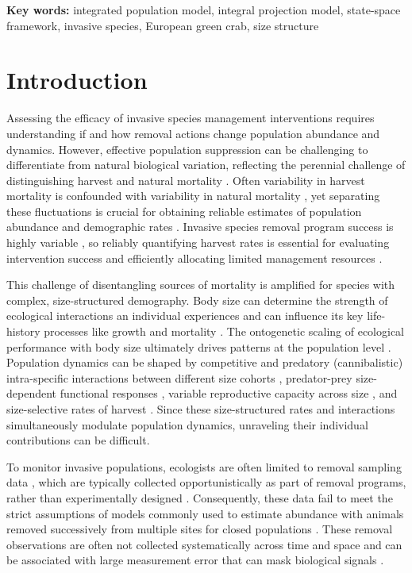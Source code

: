 \documentclass{article}
\begin{document}
\textbf{Key words:} integrated population model, integral projection model, state-space framework, invasive species, European green crab, size structure

\newpage

\section{Introduction}

Assessing the efficacy of invasive species management interventions requires understanding if and how removal actions change population abundance and dynamics. However, effective population suppression can be challenging to differentiate from natural biological variation, reflecting the perennial challenge of distinguishing harvest and natural mortality \parencite{aanes2007estimation}. Often variability in harvest mortality is confounded with variability in natural mortality \parencite{lewy2003modelling}, yet separating these fluctuations is crucial for obtaining reliable estimates of population abundance and demographic rates \parencite{walters2004fisheries}. Invasive species removal program success is highly variable \parencite{prior2018does}, so reliably quantifying harvest rates is essential for evaluating intervention success and efficiently allocating limited management resources \parencite{green2021functional}.

This challenge of disentangling sources of mortality is amplified for species with complex, size-structured demography. Body size can determine the strength of ecological interactions an individual experiences and can influence its key life-history processes like growth and mortality \parencite{de2003influence}. The ontogenetic scaling of ecological performance with body size ultimately drives patterns at the population level \parencite{werner1994ontogenetic}. Population dynamics can be shaped by competitive and predatory (cannibalistic) intra-specific interactions between different size cohorts \parencite{claessen2004population}, predator-prey size-dependent functional responses \parencite{aljetlawi2004prey}, variable reproductive capacity across size \parencite{hixon2014boffffs}, and size-selective rates of harvest \parencite{tu2018fishing}. Since these size-structured rates and interactions simultaneously modulate population dynamics, unraveling their individual contributions can be difficult. 

To monitor invasive populations, ecologists are often limited to removal sampling data \parencite{udell2022open}, which are typically collected opportunistically as part of removal programs, rather than experimentally designed \parencite{tiberti2021alien, crall2010improving, rogosch2021comparing}. Consequently, these data fail to meet the strict assumptions of models commonly used to estimate abundance with animals removed successively from multiple sites for closed populations \parencite{dorazio2005improving}. These removal observations are often not collected systematically across time and space and can be associated with large measurement error that can mask biological signals \parencite{auger2016state, sibert2003horizontal, katsanevakis2012monitoring}.
\end{document}
